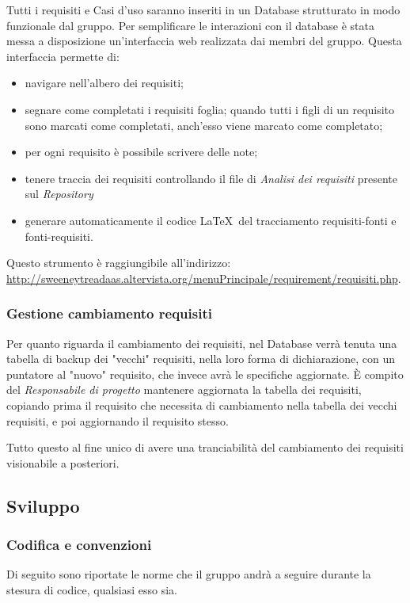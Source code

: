 \documentclass[a4paper]{article}
\begin{document}
            Tutti i requisiti e Casi d'uso saranno inseriti in un Database strutturato in modo funzionale dal gruppo. 
            Per semplificare le interazioni con il database è stata messa a disposizione un'interfaccia web realizzata dai membri del gruppo.
            Questa interfaccia permette di:
            \begin{itemize}
                \item navigare nell'albero dei requisiti;
                \item segnare come completati i requisiti foglia; quando tutti i figli di un requisito sono marcati come completati, 
                anch'esso viene marcato come completato;
                \item per ogni requisito è possibile scrivere delle note;
                \item tenere traccia dei requisiti controllando il file di \emph{Analisi dei requisiti} presente sul \emph{Repository}
                \item generare automaticamente il codice \LaTeX \ del tracciamento requisiti-fonti e fonti-requisiti.
            \end{itemize}  
            
            Questo strumento è raggiungibile all'indirizzo: \newline \url{http://sweeneytreadaas.altervista.org/menuPrincipale/requirement/requisiti.php}.
		\subsubsection{Gestione cambiamento requisiti}
		Per quanto riguarda il cambiamento dei requisiti, nel Database verrà tenuta una tabella di backup dei "vecchi" requisiti,
		nella loro forma di dichiarazione, con un puntatore al "nuovo" requisito, che invece avrà le specifiche aggiornate. È compito del
		\emph{Responsabile di progetto} mantenere aggiornata la tabella dei requisiti, copiando prima il requisito che necessita di cambiamento
		nella tabella dei vecchi requisiti, e poi aggiornando il requisito stesso.

		Tutto questo al fine unico di avere una tranciabilità del cambiamento dei requisiti visionabile a posteriori.
		\subsection{Sviluppo}
		\subsubsection{Codifica e convenzioni}
		Di seguito sono riportate le norme che il gruppo andrà a seguire durante la stesura di codice, qualsiasi esso sia.
\end{document}
